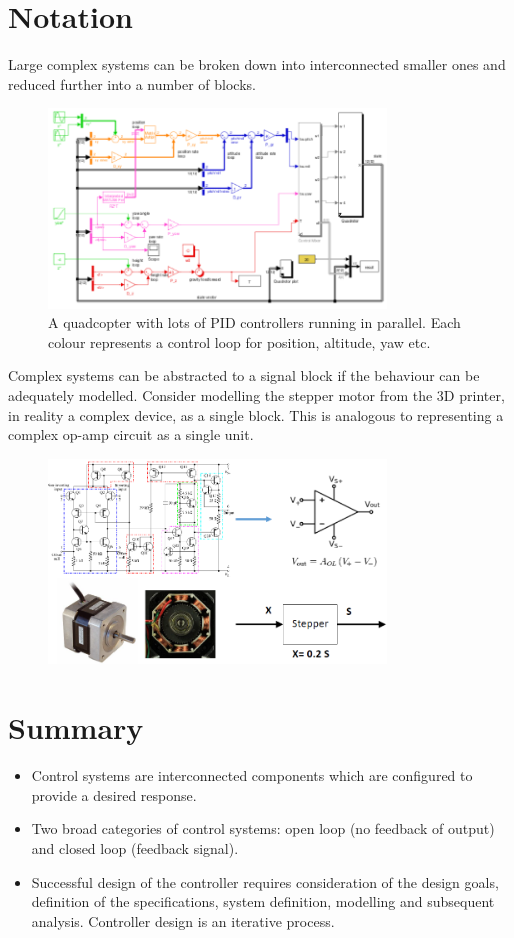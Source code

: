 \documentclass[class=report, crop=false, 12pt,a4paper]{standalone}
\begin{document}
\section{Notation}
Large complex systems can be broken down into interconnected smaller ones and reduced further into a number of blocks. 
\begin{figure}[H]
  \centering
  \includegraphics[width = 0.8\textwidth]{../img/quadcopterexampleblock.png}
  \caption{A quadcopter with lots of PID controllers running in parallel. Each colour represents a control loop for position, altitude, yaw etc.}
\end{figure}
Complex systems can be abstracted to a signal block if the behaviour can be adequately modelled. Consider modelling the stepper motor from the 3D printer, in reality a complex device, as a single block. This is analogous to representing a complex op-amp circuit as a single unit.
\begin{figure}[H]
  \centering
  \includegraphics[width = 0.8\textwidth]{../img/blockdiagram4.png}
\end{figure}
\section{Summary}
\begin{itemize}
  \item Control systems are interconnected components which are configured to provide a desired response.
  \item Two broad categories of control systems: open loop (no feedback of output) and closed loop (feedback signal).
  \item Successful design of the controller requires consideration of the design goals, definition of the specifications, system definition, modelling and subsequent analysis. Controller design is an iterative process.
\end{itemize}
\end{document}
